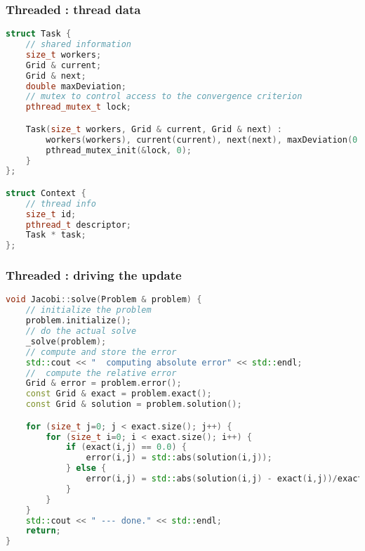 \begin{frame}[fragile]
% 
  \frametitle{Threaded : thread data}
%
  \begin{lstlisting}[language=c++,name=Jacobi:threaded]
struct Task {
    // shared information 
    size_t workers;
    Grid & current;
    Grid & next;
    double maxDeviation;
    // mutex to control access to the convergence criterion
    pthread_mutex_t lock; 

    Task(size_t workers, Grid & current, Grid & next) :
        workers(workers), current(current), next(next), maxDeviation(0.0) {
        pthread_mutex_init(&lock, 0);
    }
};

struct Context {
    // thread info
    size_t id;
    pthread_t descriptor;
    Task * task;
};

  \end{lstlisting}
%
\end{frame}

\begin{frame}[fragile]
% 
  \frametitle{Threaded : driving the update}
%
  \begin{lstlisting}[language=c++,name=Jacobi:threaded]
void Jacobi::solve(Problem & problem) {
    // initialize the problem
    problem.initialize();
    // do the actual solve
    _solve(problem);
    // compute and store the error
    std::cout << "  computing absolute error" << std::endl;
    //  compute the relative error
    Grid & error = problem.error();
    const Grid & exact = problem.exact();
    const Grid & solution = problem.solution();

    for (size_t j=0; j < exact.size(); j++) {
        for (size_t i=0; i < exact.size(); i++) {
            if (exact(i,j) == 0.0) {
                error(i,j) = std::abs(solution(i,j));
            } else {
                error(i,j) = std::abs(solution(i,j) - exact(i,j))/exact(i,j);
            }
        }
    }
    std::cout << " --- done." << std::endl;
    return;
}
  \end{lstlisting}
%
\end{frame}

